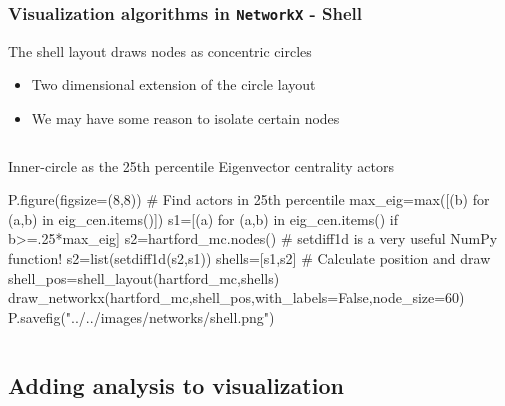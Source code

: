 \documentclass[xcolor=dvipsnames, 9pt]{beamer}
\newenvironment{code}{\begin{semiverbatim} \begin{footnotesize}}
{\end{footnotesize}\end{semiverbatim}}
\begin{document}
\begin{frame}[fragile]
    \frametitle{Visualization algorithms in \texttt{NetworkX} - Shell}
    The shell layout draws nodes as concentric circles
    \begin{itemize}
        \item Two dimensional extension of the circle layout
        \item We may have some reason to isolate certain nodes
    \end{itemize}
    \begin{columns}
            \begin{block}{Inner-circle as the 25th percentile Eigenvector centrality actors}
                \begin{code}
\scriptsize{P.figure(figsize=(8,8))
\alert<2>{# Find actors in 25th percentile
max_eig=max([(b) for (a,b) in eig_cen.items()])
s1=[(a) for (a,b) in eig_cen.items() if b>=.25*max_eig]
s2=hartford_mc.nodes()}
\alert<3>{# setdiff1d is a very useful NumPy function!
s2=list(setdiff1d(s2,s1))       
shells=[s1,s2]}    
\alert<4>{# Calculate position and draw          
shell_pos=shell_layout(hartford_mc,shells)
draw_networkx(hartford_mc,shell_pos,with_labels=False,node_size=60)
P.savefig("../../images/networks/shell.png")}}
                \end{code}
            \end{block}
    \end{columns}
\end{frame}


\subsection{Adding analysis to visualization} %
\label{sub:adding_analysis_to_visualization}
\end{document}
